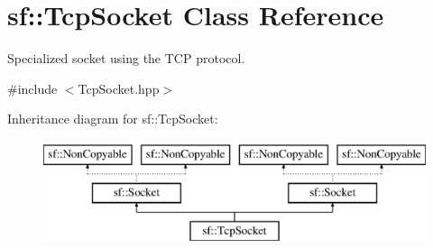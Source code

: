 \hypertarget{classsf_1_1_tcp_socket}{\section{sf\-:\-:Tcp\-Socket Class Reference}
\label{classsf_1_1_tcp_socket}
}


Specialized socket using the T\-C\-P protocol.  




{\ttfamily \#include $<$Tcp\-Socket.\-hpp$>$}

Inheritance diagram for sf\-:\-:Tcp\-Socket\-:\begin{figure}[H]
\begin{center}
\leavevmode
\includegraphics[height=3.000000cm]{classsf_1_1_tcp_socket}
\end{center}
\end{figure}
